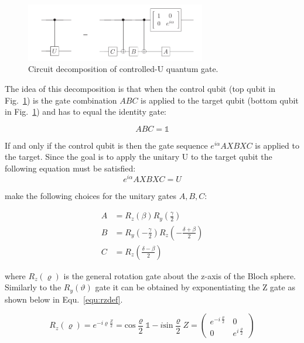 \begin{figure}[ht]
   \centering
   \includegraphics[width=0.7\textwidth]{img/controlledudecomp.png}
   \caption[]{Circuit decomposition of controlled-U quantum gate.\footnotemark[14]}
   \label{img:cudecomposition}
\end{figure}


The idea of this decomposition is that when the control qubit (top qubit in Fig.~\ref{img:cudecomposition}) is \0 the gate combination $ABC$ is applied to the target qubit (bottom qubit in Fig.~\ref{img:cudecomposition}) and has to equal the identity gate:

\begin{equation}
\label{equ:abcidentity}
ABC = \mathbb{1}
\end{equation}

If and only if the control qubit is \1 then the gate sequence $e^{i\alpha}AXBXC$ is applied to the target. Since the goal is to apply the unitary U to the target qubit the following equation must be satisfied:
\begin{equation}
\label{equ:UAXBXC}
e^{i\alpha}AXBXC = U
\end{equation}

 make the following choices for the unitary gates $A,B,C$:

\begin{align}\label{equ:abc}
A &=  R_z(\beta)R_y(\frac{\gamma}{2})\\
B &= R_y(-\frac{\gamma}{2})R_z(-\frac{\delta+\beta}{2})\\
C &= R_z(\frac{\delta-\beta}{2})
\end{align}

where $R_z(\varrho)$ is the general rotation gate about the z-axis of the Bloch sphere. Similarly to the $R_y(\vartheta)$ gate it can be obtained by exponentiating the Z gate as shown below in Equ.~\ref{equ:rzdef}.

\begin{equation}
\label{equ:rzdef}
R_z(\varrho) = e^{-i\varrho\frac{Z}{2}} = \text{cos}\frac{\varrho}{2} \mathbb{1}- i\text{sin}\frac{\varrho}{2}Z = \begin{pmatrix}
e^{-i\frac{\varrho}{2}} & 0 \\
0 & e^{i\frac{\varrho}{2}}
\end{pmatrix}
\end{equation}

